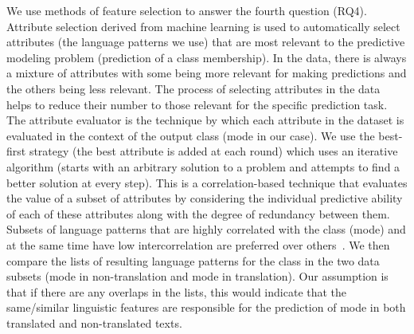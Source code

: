 \documentclass[output=paper,colorlinks,citecolor=brown]{langscibook}
\begin{document}
We use methods of feature selection to answer the fourth question (RQ4). Attribute selection derived from machine learning is used to automatically select attributes (the language patterns we use) that are most relevant to the predictive modeling problem (prediction of a class membership). In the data, there is always a mixture of attributes with some being more relevant for making predictions and the others being less relevant. The process of selecting attributes in the data helps to reduce their number to those relevant for the specific prediction task. The attribute evaluator is the technique by which each attribute in the dataset is evaluated in the context of the output class (mode in our case). We use the best-first strategy (the best attribute is added at each round) which uses an iterative algorithm (starts with an arbitrary solution to a problem and attempts to find a better solution at every step). This is a correlation-based technique that evaluates the value of a subset of attributes by considering the individual predictive ability of each of these attributes along with the degree of redundancy between them. Subsets of language patterns that are highly correlated with the class (mode) and at the same time have low intercorrelation are preferred over others~\citep[see][for more details]{Hall1998}. We then compare the lists of resulting language patterns for the class in the two data subsets (mode in non-translation and mode in translation). Our assumption is that if there are any overlaps in the lists, this would indicate that the same/similar linguistic features are responsible for the prediction of mode in both translated and non-translated texts.



\end{document}
